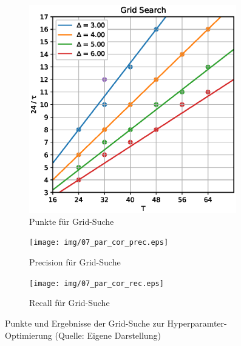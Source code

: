 \begin{figure}
    \centering
    \begin{subfigure}{.25\textwidth}
        \centering
        \includegraphics[width=0.99\textwidth, keepaspectratio, interpolate]{img/07_grid_csn.eps}
        \caption{Punkte für Grid-Suche}
        \label{fig:exp-hparams-grid}
    \end{subfigure}%
    \hfill
    \begin{subfigure}{.37\textwidth}
        \centering
        \texttt{[image: img/07\_par\_cor\_prec.eps]}
        \caption{Precision für Grid-Suche}
        \label{fig:exp-hparams-prec}
    \end{subfigure}
    \begin{subfigure}{.37\textwidth}
        \centering
        \texttt{[image: img/07\_par\_cor\_rec.eps]}
        \caption{Recall für Grid-Suche}
        \label{fig:exp-hparams-rec}
    \end{subfigure}
    \caption[Punkte und Ergebnisse der Grid-Suche zur Hyperparamter-Optimierung]{Punkte und Ergebnisse der Grid-Suche zur Hyperparamter-Optimierung (Quelle: Eigene Darstellung)}
\end{figure}

